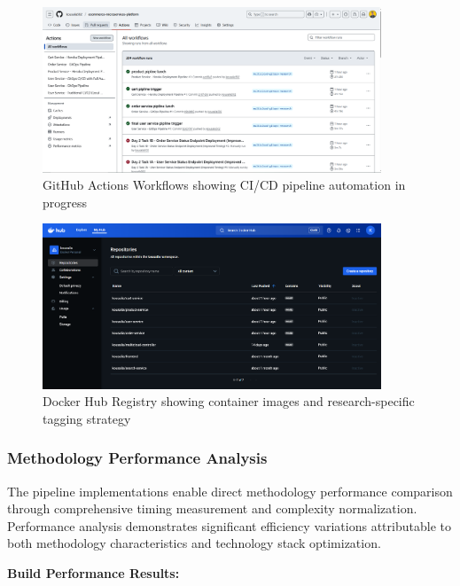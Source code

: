 \begin{figure}[H]
\centering
\includegraphics[width=0.9\textwidth]{figures/chapter5/github-actions-running.png}
\caption{GitHub Actions Workflows showing CI/CD pipeline automation in progress}
\label{fig:github-actions-running}
\end{figure}

\begin{figure}[H]
\centering
\includegraphics[width=0.9\textwidth]{figures/chapter5/docker-images-registry.png}
\caption{Docker Hub Registry showing container images and research-specific tagging strategy}
\label{fig:docker-images-registry}
\end{figure}

\subsubsection{Methodology Performance Analysis}

The pipeline implementations enable direct methodology performance comparison through comprehensive timing measurement and complexity normalization. Performance analysis demonstrates significant efficiency variations attributable to both methodology characteristics and technology stack optimization.

\textbf{Build Performance Results:}

